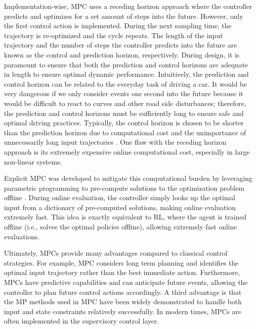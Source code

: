 Implementation-wise, MPC uses a receding horizon approach where the controller predicts and optimizes for a set amount of steps into the future.  However, only the first control action is implemented.  During the next sampling time, the trajectory is re-optimized and the cycle repeats. The length of the input trajectory and the number of steps the controller predicts into the future are known as the control and prediction horizon, respectively. During design, it is paramount to ensure that both the prediction and control horizons are adequate in length to ensure optimal dynamic performance.  Intuitively, the prediction and control horizon can be related to the everyday task of driving a car.  It would be very dangerous if we only consider events one second into the future because it would be difficult to react to curves and other road side disturbances; therefore, the prediction and control horizons must be sufficiently long to ensure safe and optimal driving practices. Typically, the control horizon is chosen to be shorter than the prediction horizon due to computational cost and the unimportance of unnecessarily long input trajectories \cite{prediction_horizon}.  One flaw with the receding horizon approach is its extremely expensive online computational cost, especially in large non-linear systems.  

Explicit MPC was developed to mitigate this computational burden by leveraging parametric programming to pre-compute solutions to the optimization problem offline \cite{explicit_MPC}.  During online evaluation, the controller simply looks up the optimal input from a dictionary of pre-computed solutions, making online evaluation extremely fast. This idea is exactly equivalent to RL, where the agent is trained offline (i.e., solves the optimal policies offline), allowing extremely fast online evaluations. 

Ultimately, MPCs provide many advantages compared to classical control strategies.  For example, MPC considers long term planning and identifies the optimal input trajectory rather than the best immediate action.  Furthermore, MPCs have predictive capabilities and can anticipate future events, allowing the controller to plan future control actions accordingly.  A third advantage is that the MP methods used in MPC have been widely demonstrated to handle both input and state constraints relatively successfully.  In modern times, MPCs are often implemented in the supervisory control layer.

